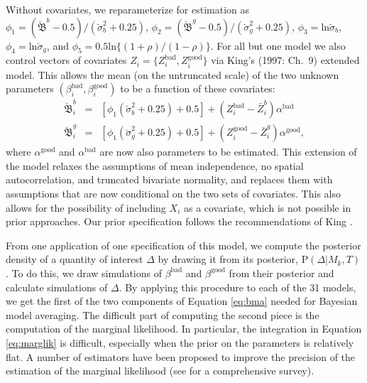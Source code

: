 \documentclass[11pt,titlepage]{article}
\newcommand{\bbetau}{\breve{\mathfrak B}}
\newcommand{\sigmau}{\breve{\sigma}}
\renewcommand{\P}{\text{P}}
\newcommand{\bb}{\beta^{\text{bad}}}
\newcommand{\bg}{\beta^{\text{good}}}
\begin{document}
Without covariates, we reparameterize for estimation as
$\phi_1=(\bbetau^b-0.5)/(\sigmau_b^2+0.25)$,
$\phi_2=(\bbetau^g-0.5)/(\sigmau_g^2+0.25)$,
$\phi_3=\text{ln}\sigmau_b$, $\phi_4=\text{ln}\sigmau_g$, and
$\phi_5=0.5\text{ln}\{(1+\rho)/(1-\rho)\}$.  For all but one model we
also control vectors of covariates
$Z_i=\{Z_i^{\text{bad}},Z_i^{\text{good}}\}$ via King's (1997: Ch.\ 9)
extended model.  This allows the mean (on the untruncated scale) of
the two unknown parameters $(\bb_i, \bg_i)$ to be a function of these
covariates:
\begin{eqnarray}
\bbetau_i^b & = & [\phi_1 (\sigmau^2_b + 0.25) + 0.5] + (Z_i^{\text{bad}} -
\bar{Z}_i^b) \alpha^{\text{bad}} \\
\bbetau_i^g & = & [\phi_1 (\sigmau^2_g + 0.25) + 0.5] + (Z_i^{\text{good}} -
\bar{Z}_i^g) \alpha^{\text{good}},
\end{eqnarray}
where $\alpha^{\text{good}}$ and $\alpha^{\text{bad}}$ are now also
parameters to be estimated.  This extension of the model relaxes the
assumptions of mean independence, no spatial autocorrelation, and
truncated bivariate normality, and replaces them with assumptions that
are now conditional on the two sets of covariates.  This also allows
for the possibility of including $X_i$ as a covariate, which is not
possible in prior approaches.  Our prior specification follows the
recommendations of King \citeyear[Ch.7]{king:97}.

From one application of one specification of this model, we compute
the posterior density of a quantity of interest $\Delta$ by drawing it
from its posterior, $\P(\Delta|M_k,T)$.  To do this, we draw
simulations of $\bb$ and $\bg$ from their posterior and calculate
simulations of $\Delta$.  By applying this procedure to each of the 31
models, we get the first of the two components of Equation
\ref{eq:bma} needed for Bayesian model averaging.  The difficult part
of computing the second piece is the computation of the marginal
likelihood.  In particular, the integration in Equation
\ref{eq:marglik} is difficult, especially when the prior on the
parameters is relatively flat. A number of estimators have been
proposed to improve the precision of the estimation of the marginal
likelihood (see \citet{kass:raft:95} for a comprehensive survey).
\end{document}

